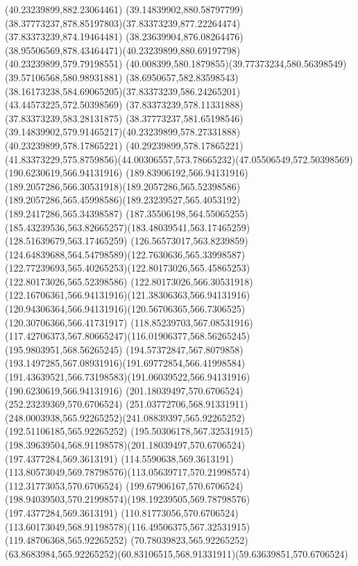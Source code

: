 {{	\lineto(40.23239899,882.23064461)
	\curveto(39.14839902,880.58797799)(38.37773237,878.85197803)(37.83373239,877.22264474)
	\closepath
	\moveto(37.83373239,874.19464481)
	\curveto(38.23639904,876.08264476)(38.95506569,878.43464471)(40.23239899,880.69197798)
	\lineto(40.23239899,579.79198551)
	\curveto(40.008399,580.1879855)(39.77373234,580.56398549)(39.57106568,580.98931881)
	\curveto(38.6950657,582.83598543)(38.16173238,584.69065205)(37.83373239,586.24265201)
	\closepath
	\moveto(43.44573225,572.50398569)
	\lineto(37.83373239,578.11331888)
	\lineto(37.83373239,583.28131875)
	\curveto(38.37773237,581.65198546)(39.14839902,579.91465217)(40.23239899,578.27331888)
	\lineto(40.23239899,578.17865221)
	\lineto(40.29239899,578.17865221)
	\curveto(41.83373229,575.8759856)(44.00306557,573.78665232)(47.05506549,572.50398569)
	\closepath
	\moveto(190.6230619,566.94131916)
	\curveto(189.83906192,566.94131916)(189.2057286,566.30531918)(189.2057286,565.52398586)
	\curveto(189.2057286,565.45998586)(189.23239527,565.4053192)(189.2417286,565.34398587)
	\curveto(187.35506198,564.55065255)(185.43239536,563.82665257)(183.48039541,563.17465259)
	\lineto(128.51639679,563.17465259)
	\curveto(126.56573017,563.8239859)(124.64839688,564.54798589)(122.7630636,565.33998587)
	\curveto(122.77239693,565.40265253)(122.80173026,565.45865253)(122.80173026,565.52398586)
	\curveto(122.80173026,566.30531918)(122.16706361,566.94131916)(121.38306363,566.94131916)
	\curveto(120.94306364,566.94131916)(120.56706365,566.7306525)(120.30706366,566.41731917)
	\curveto(118.85239703,567.08531916)(117.42706373,567.80665247)(116.01906377,568.56265245)
	\lineto(195.9803951,568.56265245)
	\curveto(194.57372847,567.8079858)(193.1497285,567.08931916)(191.69772854,566.41998584)
	\curveto(191.43639521,566.73198583)(191.06039522,566.94131916)(190.6230619,566.94131916)
	\moveto(201.18039497,570.6706524)
	\lineto(252.23239369,570.6706524)
	\curveto(251.03772706,568.91331911)(248.0003938,565.92265252)(241.08839397,565.92265252)
	\lineto(192.51106185,565.92265252)
	\curveto(195.50306178,567.32531915)(198.39639504,568.91198578)(201.18039497,570.6706524)
	\moveto(197.4377284,569.3613191)
	\lineto(114.5590638,569.3613191)
	\curveto(113.80573049,569.78798576)(113.05639717,570.21998574)(112.31773053,570.6706524)
	\lineto(199.67906167,570.6706524)
	\curveto(198.94039503,570.21998574)(198.19239505,569.78798576)(197.4377284,569.3613191)
	\moveto(110.81773056,570.6706524)
	\curveto(113.60173049,568.91198578)(116.49506375,567.32531915)(119.48706368,565.92265252)
	\lineto(70.78039823,565.92265252)
	\curveto(63.8683984,565.92265252)(60.83106515,568.91331911)(59.63639851,570.6706524)
}}
